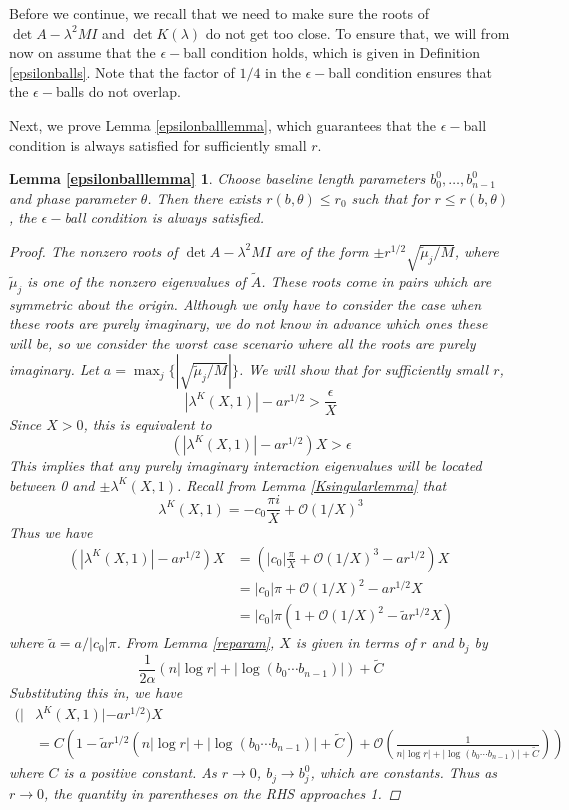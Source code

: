 \documentclass[thesis.tex]{subfiles}
\begin{document}
Before we continue, we recall that we need to make sure the roots of $\det A - \lambda^2 M I$ and $\det K(\lambda)$ do not get too close. To ensure that, we will from now on assume that the $\epsilon-$ball condition holds, which is given in Definition \ref{epsilonballs}. Note that the factor of $1/4$ in the $\epsilon-$ball condition ensures that the $\epsilon-$balls do not overlap.

Next, we prove Lemma \ref{epsilonballlemma}, which guarantees that the $\epsilon-$ball condition is always satisfied for sufficiently small $r$.

\newtheorem*{lemma:epsilonballlemma}{Lemma \ref{epsilonballlemma}}
\begin{lemma:epsilonballlemma}
Choose baseline length parameters $b_0^0, \dots, b_{n-1}^0$ and phase parameter $\theta$. Then there exists $r(b, \theta) \leq r_0$ such that for $r \leq r(b, \theta)$, the $\epsilon-$ball condition is always satisfied.
\begin{proof}
The nonzero roots of $\det A - \lambda^2 M I$ are of the form $\pm r^{1/2} \sqrt{\tilde{\mu}_j/M}$, where $\tilde{\mu}_j$ is one of the nonzero eigenvalues of $\tilde{A}$. These roots come in pairs which are symmetric about the origin. Although we only have to consider the case when these roots are purely imaginary, we do not know in advance which ones these will be, so we consider the worst case scenario where all the roots are purely imaginary. Let $a = \max_j\{| \sqrt{\tilde{\mu}_j/M}|\}$. We will show that for sufficiently small $r$, 
\[
|\lambda^K(X,1)| - a r^{1/2} > \frac{\epsilon}{X}
\]
Since $X > 0$, this is equivalent to
\[
(|\lambda^K(X,1)| - a r^{1/2})X  > \epsilon
\]
This implies that any purely imaginary interaction eigenvalues will be located between 0 and $\pm \lambda^K(X,1)$. Recall from Lemma \ref{Ksingularlemma} that
\[
\lambda^K(X,1)
= -c_0 \frac{\pi i }{X} + \mathcal{O}(1/X)^3 
\]
Thus we have
\begin{align*}
(|\lambda^K(X,1)| - a r^{1/2})X &= \left( |c_0| \frac{\pi}{X} + \mathcal{O}(1/X)^3 - a r^{1/2} \right)X \\
&= |c_0| \pi + \mathcal{O}(1/X)^2 - a r^{1/2} X \\
&= |c_0| \pi \left(1 + \mathcal{O}(1/X)^2 - \tilde{a} r^{1/2} X\right)
\end{align*}
where $\tilde{a} = a / |c_0| \pi$. From Lemma \ref{reparam}, $X$ is given in terms of $r$ and $b_j$ by
\[
\frac{1}{2\alpha} (n |\log r| + |\log (b_0 \cdots b_{n-1})| ) + \tilde{C}
\]
Substituting this in, we have
\begin{align*}
(|&\lambda^K(X,1)| - a r^{1/2})X \\
&= C \left(1 - \tilde{a} r^{1/2}(n |\log r| + |\log (b_0 \cdots b_{n-1})| + \tilde{C}) + \mathcal{O}\left( \frac{1}{n |\log r| + |\log (b_0 \cdots b_{n-1})| + \tilde{C}} \right) \right)
\end{align*}
where $C$ is a positive constant. As $r \rightarrow 0$, $b_j \rightarrow b_j^0$, which are constants. Thus as $r \rightarrow 0$, the quantity in parentheses on the RHS approaches 1. 


\end{proof}
\end{lemma:epsilonballlemma}
\end{document}
